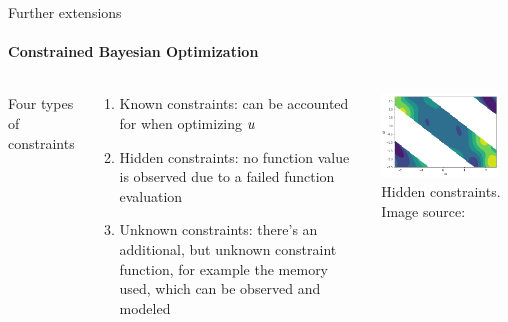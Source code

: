 \begin{frame}[c]{Further extensions}
\framesubtitle{Constrained Bayesian Optimization}

\begin{columns}[T]


Four types of constraints
\begin{small}
\begin{enumerate}
    \item Known constraints: can be accounted for when optimizing $u$
    \item Hidden constraints: no function value is observed due to a failed function evaluation~
    \item Unknown constraints: there's an additional, but unknown constraint function, for example the memory used, which can be observed and modeled
\end{enumerate}
\end{small}

\includegraphics[width=0.9\textwidth]{images/extensions/notebooks_constrained_bo_4_0.png}\\
	\footnotesize{Hidden constraints. Image source: }

\end{columns}


\end{frame}
